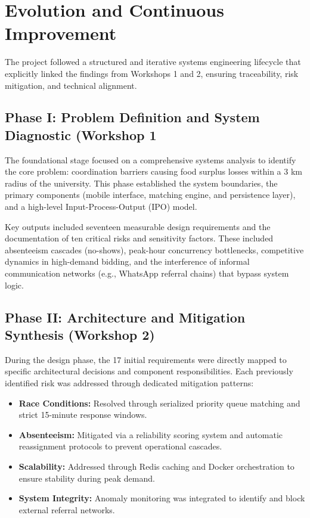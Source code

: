 \documentclass[9pt,conference]{IEEEtran}
\begin{document}
\section{Evolution and Continuous Improvement}
The project followed a structured and iterative systems engineering lifecycle that explicitly linked the findings from Workshops 1 and 2, ensuring traceability, risk mitigation, and technical alignment.
\subsection{Phase I: Problem Definition and System Diagnostic (Workshop 1}
The foundational stage focused on a comprehensive systems analysis to identify the core problem: coordination barriers causing food surplus losses within a 3 km radius of the university. This phase established the system boundaries, the primary components (mobile interface, matching engine, and persistence layer), and a high-level Input-Process-Output (IPO) model.

Key outputs included seventeen measurable design requirements and the documentation of ten critical risks and sensitivity factors. These included absenteeism cascades (no-shows), peak-hour concurrency bottlenecks, competitive dynamics in high-demand bidding, and the interference of informal communication networks (e.g., WhatsApp referral chains) that bypass system logic.

\subsection{Phase II: Architecture and Mitigation Synthesis (Workshop 2)}
During the design phase, the 17 initial requirements were directly mapped to specific architectural decisions and component responsibilities. Each previously identified risk was addressed through dedicated mitigation patterns:
\begin{itemize}
    \item \textbf{Race Conditions:} Resolved through serialized priority queue matching and strict 15-minute response windows.
    \item \textbf{Absenteeism:} Mitigated via a reliability scoring system and automatic reassignment protocols to prevent operational cascades.
    \item \textbf{Scalability:} Addressed through Redis caching and Docker orchestration to ensure stability during peak demand.
    \item \textbf{System Integrity:} Anomaly monitoring was integrated to identify and block external referral networks.
\end{itemize}
\end{document}
